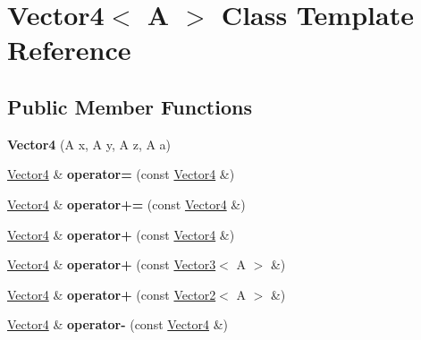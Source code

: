 \hypertarget{classVector4}{}\section{Vector4$<$ A $>$ Class Template Reference}
\label{classVector4}
\subsection*{Public Member Functions}
\begin{DoxyCompactItemize}
\item 
\hypertarget{classVector4_a1cf2939884e0a7a38eb3be6e1d8761b5}{}{\bfseries Vector4} (A x, A y, A z, A a)\label{classVector4_a1cf2939884e0a7a38eb3be6e1d8761b5}

\item 
\hypertarget{classVector4_a7cb0b4066744bbc2d521d5f7f10efd4a}{}\hyperlink{classVector4}{Vector4} \& {\bfseries operator=} (const \hyperlink{classVector4}{Vector4} \&)\label{classVector4_a7cb0b4066744bbc2d521d5f7f10efd4a}

\item 
\hypertarget{classVector4_ac4cef388fd4881e29a3992ebe2ec0843}{}\hyperlink{classVector4}{Vector4} \& {\bfseries operator+=} (const \hyperlink{classVector4}{Vector4} \&)\label{classVector4_ac4cef388fd4881e29a3992ebe2ec0843}

\item 
\hypertarget{classVector4_afc7ea78b10de61194289175969ff1776}{}\hyperlink{classVector4}{Vector4} \& {\bfseries operator+} (const \hyperlink{classVector4}{Vector4} \&)\label{classVector4_afc7ea78b10de61194289175969ff1776}

\item 
\hypertarget{classVector4_ab886d670549d7a2982263c4d8b5919f5}{}\hyperlink{classVector4}{Vector4} \& {\bfseries operator+} (const \hyperlink{classVector3}{Vector3}$<$ A $>$ \&)\label{classVector4_ab886d670549d7a2982263c4d8b5919f5}

\item 
\hypertarget{classVector4_a6e781839aba974273f6c656cf249cb22}{}\hyperlink{classVector4}{Vector4} \& {\bfseries operator+} (const \hyperlink{classVector2}{Vector2}$<$ A $>$ \&)\label{classVector4_a6e781839aba974273f6c656cf249cb22}

\item 
\hypertarget{classVector4_a2c20335afcd48779bfa1233d7280b077}{}\hyperlink{classVector4}{Vector4} \& {\bfseries operator-\/} (const \hyperlink{classVector4}{Vector4} \&)\label{classVector4_a2c20335afcd48779bfa1233d7280b077}


\end{DoxyCompactItemize}
